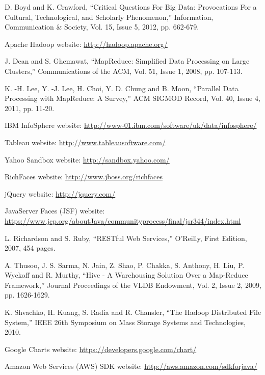 \documentclass[10pt, conference, compsocconf]{IEEEtran}
\begin{document}
\begin{thebibliography}{00}

D. Boyd and K. Crawford, ``Critical Questions For Big Data: Provocations For a Cultural, Technological, and Scholarly Phenomenon,'' Information, Communication \& Society, Vol. 15, Issue 5, 2012, pp. 662-679.

Apache Hadoop website: \url{http://hadoop.apache.org/}

J. Dean and S. Ghemawat, ``MapReduce: Simplified Data Processing on Large Clusters,'' Communications of the ACM, Vol. 51, Issue 1, 2008, pp. 107-113.

K. -H. Lee, Y. -J. Lee, H. Choi, Y. D. Chung and B. Moon, ``Parallel Data Processing with MapReduce: A Survey,'' ACM SIGMOD Record, Vol. 40, Issue 4, 2011, pp. 11-20. 

IBM InfoSphere website: \url{http://www-01.ibm.com/software/uk/data/infosphere/}

Tableau website: \url{http://www.tableausoftware.com/}

Yahoo Sandbox website: \url{http://sandbox.yahoo.com/}

RichFaces website: \url{http://www.jboss.org/richfaces}

jQuery website: \url{http://jquery.com/}

JavaServer Faces (JSF) website: \url{https://www.jcp.org/aboutJava/communityprocess/final/jsr344/index.html}

L. Richardson and S. Ruby, ``RESTful Web Services,'' O'Reilly, First Edition, 2007, 454 pages.

A. Thusoo, J. S. Sarma, N. Jain, Z. Shao, P. Chakka, S. Anthony, H. Liu, P. Wyckoff and R. Murthy, ``Hive - A Warehousing Solution Over a Map-Reduce Framework,'' Journal Proceedings of the VLDB Endowment, Vol. 2, Issue 2, 2009, pp. 1626-1629. 

K. Shvachko, H. Kuang, S. Radia and R. Chansler, ``The Hadoop Distributed File System,'' IEEE 26th Symposium on Mass Storage Systems and Technologies, 2010.

Google Charts website: \url{https://developers.google.com/chart/}

Amazon Web Services (AWS) SDK website: \url{http://aws.amazon.com/sdkforjava/}


\end{thebibliography}
\end{document}

